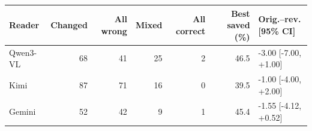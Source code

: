 \begin{tabular}{lrrrrrl}
\toprule
Reader & Changed & All wrong & Mixed & All correct & Best saved (\%) & Orig.--rev. [95\% CI]\\
\midrule
Qwen3-VL & 68 & 41 & 25 & 2 & 46.5 & -3.00 [-7.00, +1.00]\\
Kimi & 87 & 71 & 16 & 0 & 39.5 & -1.00 [-4.00, +2.00]\\
Gemini & 52 & 42 & 9 & 1 & 45.4 & -1.55 [-4.12, +0.52]\\
\bottomrule
\end{tabular}
